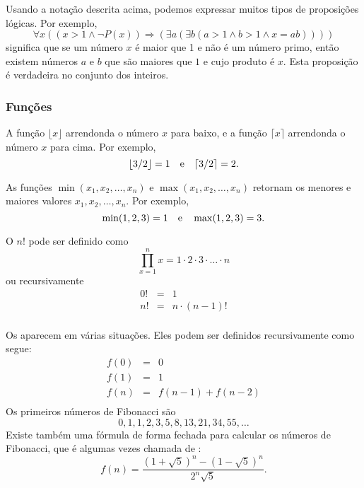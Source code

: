 Usando a notação descrita acima,
podemos expressar muitos tipos de proposições lógicas.
Por exemplo,
\[\forall x ((x>1 \land \lnot P(x)) \Rightarrow (\exists a (\exists b (a > 1 \land b > 1 \land x = ab))))\]
significa que se um número $x$ é maior que 1 e não é um número primo,
então existem números $a$ e $b$
que são maiores que $1$ e cujo produto é $x$.
Esta proposição é verdadeira no conjunto dos inteiros.

\subsubsection{Funções}

A função $\lfloor x \rfloor$ arrendonda o número $x$ para baixo, e a função
$\lceil x \rceil$ arrendonda o número $x$ para cima. Por exemplo,
\[ \lfloor 3/2 \rfloor = 1 \hspace{10px} \textrm{e} \hspace{10px} \lceil 3/2 \rceil = 2.\]

As funções $\min(x_1,x_2,\ldots,x_n)$
e $\max(x_1,x_2,\ldots,x_n)$
retornam os menores e maiores valores
$x_1,x_2,\ldots,x_n$.
Por exemplo,
\[ \min(1,2,3)=1 \hspace{10px} \textrm{e} \hspace{10px} \max(1,2,3)=3.\]


O  $n!$ pode ser definido como
\[\prod_{x=1}^n x = 1 \cdot 2 \cdot 3 \cdot \ldots \cdot n\]
ou recursivamente
\[
\begin{array}{lcl}
0! & = & 1 \\
n! & = & n \cdot (n-1)! \\
\end{array}
\]


Os 
aparecem em várias situações.
Eles podem ser definidos recursivamente como segue:
\[
\begin{array}{lcl}
f(0) & = & 0 \\
f(1) & = & 1 \\
f(n) & = & f(n-1)+f(n-2) \\
\end{array}
\]
Os primeiros números de Fibonacci são
\[0, 1, 1, 2, 3, 5, 8, 13, 21, 34, 55, \ldots\]
Existe também uma fórmula de forma fechada
para calcular os números de Fibonacci, que é algumas vezes chamada de
 :
\[f(n)=\frac{(1 + \sqrt{5})^n - (1-\sqrt{5})^n}{2^n \sqrt{5}}.\]


